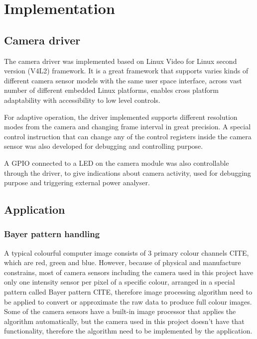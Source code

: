 \chapter{Implementation}

\section{Camera driver}

The camera driver was implemented based on Linux Video for Linux second version (V4L2) framework. It is a great framework that supports varies kinds of different camera sensor models with the same user space interface, across vast number of different embedded Linux platforms, enables cross platform adaptability with accessibility to low level controls.

For adaptive operation, the driver implemented supports different resolution modes from the camera and changing frame interval in great precision. A special control instruction that can change any of the control registers inside the camera sensor was also developed for debugging and controlling purpose.

A GPIO connected to a LED on the camera module was also controllable through the driver, to give indications about camera activity, used for debugging purpose and triggering external power analyser.

\section{Application}


\subsection{Bayer pattern handling}

A typical colourful computer image consists of 3 primary colour channels {\color{red}CITE}, which are red, green and blue. However, because of physical and manufacture constrains, most of camera sensors including the camera used in this project have only one intensity sensor per pixel of a specific colour, arranged in a special pattern called Bayer pattern {\color{red}CITE}, therefore image processing algorithm need to be applied to convert or approximate the raw data to produce full colour images. Some of the camera sensors have a built-in image processor that applies the algorithm automatically, but the camera used in this project doesn't have that functionality, therefore the algorithm need to be implemented by the application.

